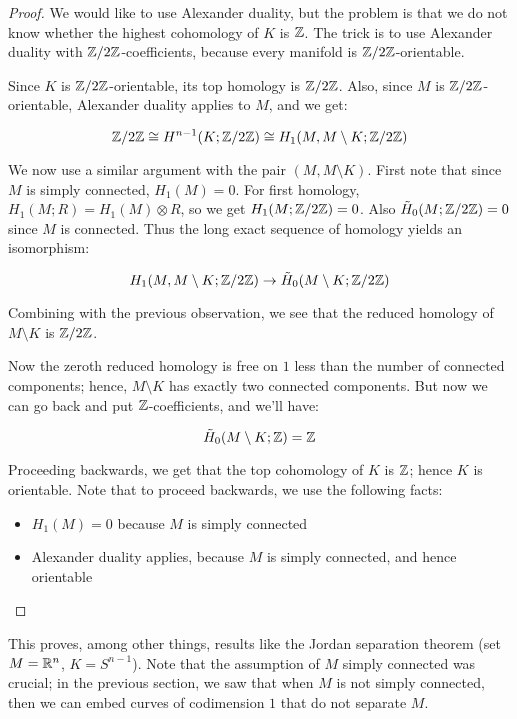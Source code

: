 \documentclass[a4paper]{amsart}
\begin{document}
\begin{proof}
  We would like to use Alexander duality, but the problem is that we do
  not know whether the highest cohomology of $K$ is $\mathbb{Z}$. The trick is
  to use Alexander duality with $\mathbb{Z}/2\mathbb{Z}$-coefficients, because every
  manifold is $\mathbb{Z}/2\mathbb{Z}$-orientable. 

  Since $K$ is $\mathbb{Z}/2\mathbb{Z}$-orientable, its top homology is $\mathbb{Z}/2\mathbb{Z}$.
  Also, since $M$ is $\mathbb{Z}/2\mathbb{Z}$-orientable, Alexander duality applies to
  $M$, and we get:

  $$\mathbb{Z}/2\mathbb{Z} \cong H^{n-1}(K;\mathbb{Z}/2\mathbb{Z}) \cong H_1(M, M \setminus K; \mathbb{Z}/2\mathbb{Z})$$
  
  We now use a similar argument with the pair $(M, M \setminus
  K)$. First note that since $M$ is simply connected, $H_1(M) =
  0$. For first homology, $H_1(M;R) = H_1(M) \otimes R$, so we get
  $H_1(M;\mathbb{Z}/2\mathbb{Z}) = 0$. Also $\tilde{H}_0(M;\mathbb{Z}/2\mathbb{Z}) = 0$ since $M$ is
  connected. Thus the long exact sequence of homology yields an
  isomorphism:

  $$H_1(M, M \setminus K; \mathbb{Z}/2\mathbb{Z}) \to \tilde{H}_0(M \setminus K; \mathbb{Z}/2\mathbb{Z})$$

  Combining with the previous observation, we see that the reduced
  homology of $M \setminus K$ is $\mathbb{Z}/2\mathbb{Z}$.

  Now the zeroth reduced homology is free on $1$ less than the number
  of connected components; hence, $M \setminus K$ has exactly two
  connected components. But now we can go back and put
  $\mathbb{Z}$-coefficients, and we'll have:

  $$\tilde{H}_0(M \setminus K; \mathbb{Z}) = \mathbb{Z}$$

  Proceeding backwards, we get that the top cohomology of $K$ is $\mathbb{Z}$;
  hence $K$ is orientable. Note that to proceed backwards, we use the
  following facts:

  \begin{itemize}

  \item $H_1(M) = 0$ because $M$ is simply connected

  \item Alexander duality applies, because $M$ is simply connected,
    and hence orientable

  \end{itemize}

\end{proof}

This proves, among other things, results like the Jordan separation
theorem (set $M = \mathbb{R}^n$, $K = S^{n-1}$). Note that the assumption of
$M$ simply connected was crucial; in the previous section, we saw that
when $M$ is not simply connected, then we can embed curves of
codimension $1$ that do not separate $M$.
\end{document}
